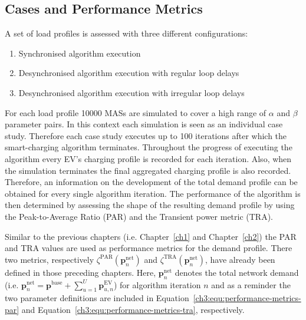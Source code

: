 \subsection{Cases and Performance Metrics}
\label{ch3:subsec:cases-and-metrics}

A set of load profiles is assessed with three different configurations:

\begin{enumerate}
	\item Synchronised algorithm execution
	\item Desynchronised algorithm execution with regular loop delays
	\item Desynchronised algorithm execution with irregular loop delays
\end{enumerate}

For each load profile 10000 MASs are simulated to cover a high range of $\alpha$ and $\beta$ parameter pairs.
In this context each simulation is seen as an individual case study.
Therefore each case study executes up to 100 iterations after which the smart-charging algorithm terminates.
Throughout the progress of executing the algorithm every EV's charging profile is recorded for each iteration.
Also, when the simulation terminates the final aggregated charging profile is also recorded.
Therefore, an information on the development of the total demand profile can be obtained for every single algorithm iteration.
The performance of the algorithm is then determined by assessing the shape of the resulting demand profile by using the Peak-to-Average Ratio (PAR) and the Transient power metric (TRA).

Similar to the previous chapters (i.e. Chapter~\ref{ch1} and Chapter~\ref{ch2}) the PAR and TRA values are used as performance metrics for the demand profile.
There two metrics, respectively $\zeta^\text{PAR}(\textbf{p}^\text{net}_n)$ and $\zeta^\text{TRA}(\textbf{p}^\text{net}_n)$, have already been defined in those preceding chapters.
Here, $\textbf{p}^\text{net}_n$ denotes the total network demand (i.e. $\textbf{p}^\text{net}_n = \textbf{p}^\text{base} + \sum_{u=1}^U \textbf{p}^\text{EV}_{u,n}$) for algorithm iteration $n$ and as a reminder the two parameter definitions are included in Equation~\ref{ch3:equ:performance-metrics-par} and Equation~\ref{ch3:equ:performance-metrics-tra}, respectively.




